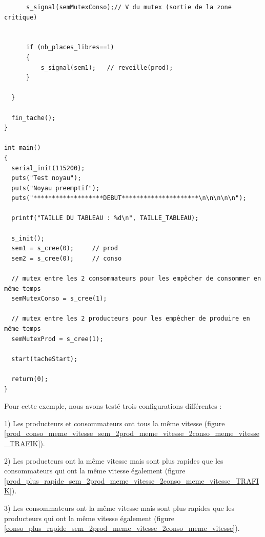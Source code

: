 \documentclass[a4paper,12pt]{report}
\begin{document}
\begin{lstlisting}
	  s_signal(semMutexConso);// V du mutex (sortie de la zone critique)


	  if (nb_places_libres==1)
	  {
		  s_signal(sem1);	// reveille(prod);
	  }

  }

  fin_tache();
}

int main()
{
  serial_init(115200);
  puts("Test noyau");
  puts("Noyau preemptif");
  puts("*******************DEBUT*********************\n\n\n\n\n");

  printf("TAILLE DU TABLEAU : %d\n", TAILLE_TABLEAU);

  s_init();
  sem1 = s_cree(0);		// prod
  sem2 = s_cree(0);		// conso
  
  // mutex entre les 2 consommateurs pour les empêcher de consommer en même temps
  semMutexConso = s_cree(1);
  
  // mutex entre les 2 producteurs pour les empêcher de produire en même temps
  semMutexProd = s_cree(1);		

  start(tacheStart);

  return(0);
}
\end{lstlisting}

Pour cette exemple, nous avons testé trois configurations différentes :\newline 

1) Les producteurs et consommateurs ont tous la même vitesse (figure \ref{prod_conso_meme_vitesse_sem_2prod_meme_vitesse_2conso_meme_vitesse_TRAFIK}).

2) Les producteurs ont la même vitesse mais sont plus rapides que les consommateurs qui ont la même vitesse également (figure \ref{prod_plus_rapide_sem_2prod_meme_vitesse_2conso_meme_vitesse_TRAFIK}).

3) Les consommateurs ont la même vitesse mais sont plus rapides que les producteurs qui ont la même vitesse également (figure \ref{conso_plus_rapide_sem_2prod_meme_vitesse_2conso_meme_vitesse}).



\newpage
\end{document}
